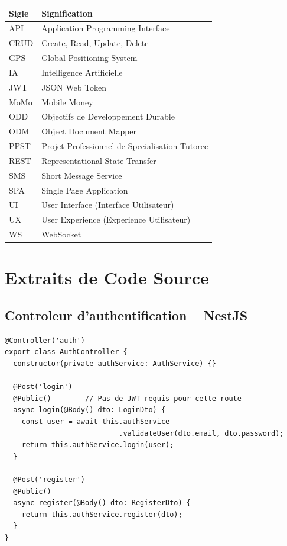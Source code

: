 \documentclass[12pt,a4paper]{report}
\begin{document}
\begin{tabular}{ll}
\toprule
\textbf{Sigle} & \textbf{Signification} \\ \midrule
API & Application Programming Interface \\
CRUD & Create, Read, Update, Delete \\
GPS & Global Positioning System \\
IA & Intelligence Artificielle \\
JWT & JSON Web Token \\
MoMo & Mobile Money \\
ODD & Objectifs de Developpement Durable \\
ODM & Object Document Mapper \\
PPST & Projet Professionnel de Specialisation Tutoree \\
REST & Representational State Transfer \\
SMS & Short Message Service \\
SPA & Single Page Application \\
UI & User Interface (Interface Utilisateur) \\
UX & User Experience (Experience Utilisateur) \\
WS & WebSocket \\ \bottomrule
\end{tabular}

\chapter{Extraits de Code Source}

\section{Controleur d'authentification -- NestJS}

\begin{lstlisting}[caption=AuthController -- Endpoint de connexion]
@Controller('auth')
export class AuthController {
  constructor(private authService: AuthService) {}

  @Post('login')
  @Public()        // Pas de JWT requis pour cette route
  async login(@Body() dto: LoginDto) {
    const user = await this.authService
                           .validateUser(dto.email, dto.password);
    return this.authService.login(user);
  }

  @Post('register')
  @Public()
  async register(@Body() dto: RegisterDto) {
    return this.authService.register(dto);
  }
}
\end{lstlisting}
\end{document}
